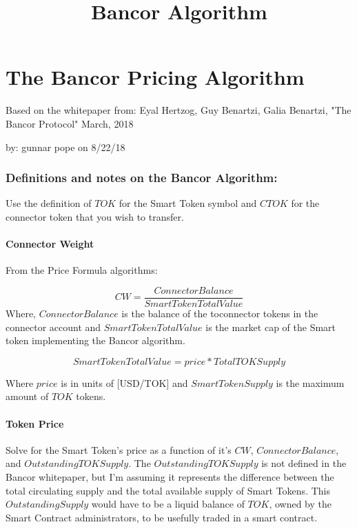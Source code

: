 \documentclass[11pt]{article}
\title{Bancor Algorithm}
\begin{document}
    
    
    \maketitle
    
    

    
    \section{The Bancor Pricing
Algorithm}\label{the-bancor-pricing-algorithm}

Based on the whitepaper from: Eyal Hertzog, Guy Benartzi, Galia
Benartzi, "The Bancor Protocol" March, 2018

by: gunnar pope on 8/22/18

    \subsubsection{Definitions and notes on the Bancor
Algorithm:}\label{definitions-and-notes-on-the-bancor-algorithm}

Use the definition of \(TOK\) for the Smart Token symbol and \(CTOK\)
for the connector token that you wish to transfer.

\paragraph{Connector Weight}\label{connector-weight}

From the Price Formula algorithms:

\[ CW = \frac{ConnectorBalance}{SmartTokenTotalValue}\] Where,
\(ConnectorBalance\) is the balance of the toconnector tokens in the
connector account and \(SmartTokenTotalValue\) is the market cap of the
Smart token implementing the Bancor algorithm.

\[SmartTokenTotalValue= price*TotalTOKSupply\]

Where \(price\) is in units of {[}USD/TOK{]} and \(SmartTokenSupply\) is
the maximum amount of \(TOK\) tokens.

\paragraph{Token Price}\label{token-price}

Solve for the Smart Token's price as a function of it's \(CW\),
\(ConnectorBalance\), and \(OutstandingTOKSupply\). The
\(OutstandingTOKSupply\) is not defined in the Bancor whitepaper, but
I'm assuming it represents the difference between the total circulating
supply and the total available supply of Smart Tokens. This
\(OutstandingSupply\) would have to be a liquid balance of \(TOK\),
owned by the Smart Contract administrators, to be usefully traded in a
smart contract.
\end{document}
